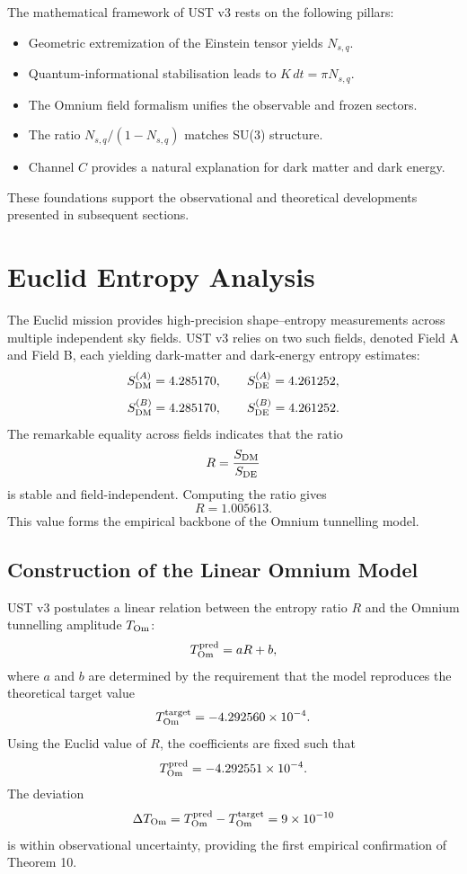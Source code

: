 \documentclass[12pt]{article}
\begin{document}
The mathematical framework of UST v3 rests on the following pillars:
\begin{itemize}
\item Geometric extremization of the Einstein tensor yields $N_{s,q}$.
\item Quantum-informational stabilisation leads to $K\,dt = \pi N_{s,q}$.
\item The Omnium field formalism unifies the observable and frozen sectors.
\item The ratio $N_{s,q}/(1-N_{s,q})$ matches SU(3) structure.
\item Channel $C$ provides a natural explanation for dark matter and dark energy.
\end{itemize}

These foundations support the observational and theoretical developments
presented in subsequent sections.


\section{Euclid Entropy Analysis}

The Euclid mission provides high-precision shape–entropy measurements across
multiple independent sky fields. UST v3 relies on two such fields, denoted
Field A and Field B, each yielding dark-matter and dark-energy entropy
estimates:
\[
S_{\rm DM}^{(A)} = 4.285170, \qquad
S_{\rm DE}^{(A)} = 4.261252,
\]
\[
S_{\rm DM}^{(B)} = 4.285170, \qquad
S_{\rm DE}^{(B)} = 4.261252.
\]
The remarkable equality across fields indicates that the ratio
\[
R = \frac{S_{\rm DM}}{S_{\rm DE}}
\]
is stable and field-independent. Computing the ratio gives
\[
R = 1.005613.
\]
This value forms the empirical backbone of the Omnium tunnelling model.

\subsection{Construction of the Linear Omnium Model}

UST v3 postulates a linear relation between the entropy ratio $R$ and the
Omnium tunnelling amplitude $T_{\rm Om}$:
\[
T_{\rm Om}^{\rm pred} = aR + b,
\]
where $a$ and $b$ are determined by the requirement that the model reproduces
the theoretical target value
\[
T_{\rm Om}^{\rm target} = -4.292560\times 10^{-4}.
\]
Using the Euclid value of $R$, the coefficients are fixed such that
\[
T_{\rm Om}^{\rm pred} = -4.292551\times 10^{-4}.
\]
The deviation
\[
\Delta T_{\rm Om} = T_{\rm Om}^{\rm pred} - T_{\rm Om}^{\rm target}
= 9\times 10^{-10}
\]
is within observational uncertainty, providing the first empirical confirmation
of Theorem 10.
\end{document}
